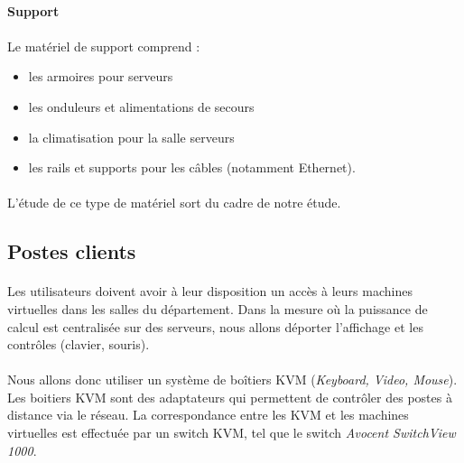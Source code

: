 \paragraph{Support}

\paragraph{} Le matériel de support comprend :

\begin{itemize}
  \item les armoires pour serveurs
  \item les onduleurs et alimentations de secours
  \item la climatisation pour la salle serveurs
  \item les rails et supports pour les câbles (notamment Ethernet).
\end{itemize}

\paragraph{} L'étude de ce type de matériel sort du cadre de notre étude.

\subsection{Postes clients}

\paragraph{} Les utilisateurs doivent avoir à leur disposition un accès à leurs
machines virtuelles dans les salles du département. Dans la mesure où la
puissance de calcul est centralisée sur des serveurs, nous allons déporter
l'affichage et les contrôles (clavier, souris).

\paragraph{} Nous allons donc utiliser un système de boîtiers KVM
(\emph{Keyboard, Video, Mouse}). Les boitiers KVM sont des adaptateurs qui
permettent de contrôler des postes à distance via le réseau. La correspondance
entre les KVM et les machines virtuelles est effectuée par un switch KVM, tel
que le switch \emph{Avocent SwitchView 1000}.
